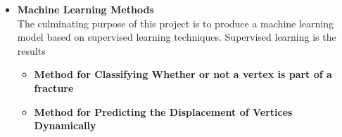 \begin{itemize}
\item \textbf{Machine Learning Methods}
\bigskip
\\
The culminating purpose of this project is to produce a machine learning model based on supervised learning techniques. Supervised learning is the results 






\begin{itemize}
\bigskip
\item \textbf{Method for Classifying Whether or not a vertex is part of a fracture}
\bigskip
\\


\item \textbf{Method for Predicting the Displacement of Vertices Dynamically}
\bigskip
\\


\end{itemize}


\end{itemize}